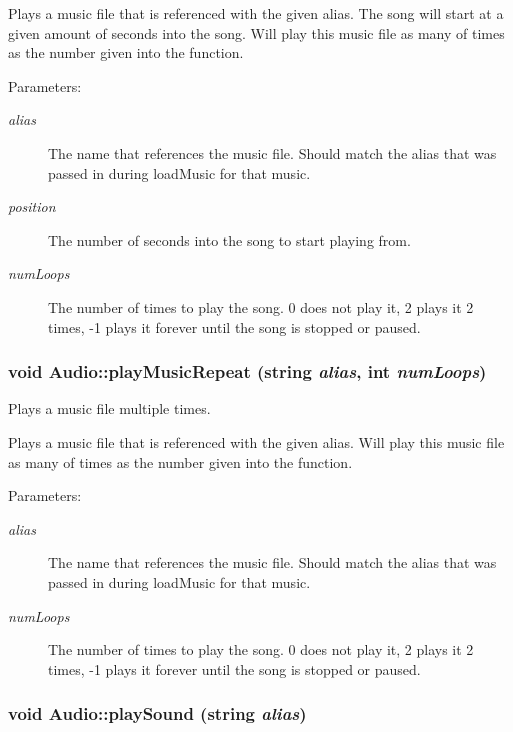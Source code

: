 Plays a music file that is referenced with the given alias. The song will start at a given amount of seconds into the song. Will play this music file as many of times as the number given into the function. \begin{Desc}
\item[Parameters:]
\begin{description}
\item[{\em alias}]The name that references the music file. Should match the alias that was passed in during loadMusic for that music. \item[{\em position}]The number of seconds into the song to start playing from. \item[{\em numLoops}]The number of times to play the song. 0 does not play it, 2 plays it 2 times, -1 plays it forever until the song is stopped or paused. \end{description}
\end{Desc}
\hypertarget{class_audio_a9ec7ff20da8b33428d39b0262743dac}{
\subsubsection[{playMusicRepeat}]{\setlength{\rightskip}{0pt plus 5cm}void Audio::playMusicRepeat (string {\em alias}, \/  int {\em numLoops})}}
\label{class_audio_a9ec7ff20da8b33428d39b0262743dac}


Plays a music file multiple times. 

Plays a music file that is referenced with the given alias. Will play this music file as many of times as the number given into the function. \begin{Desc}
\item[Parameters:]
\begin{description}
\item[{\em alias}]The name that references the music file. Should match the alias that was passed in during loadMusic for that music. \item[{\em numLoops}]The number of times to play the song. 0 does not play it, 2 plays it 2 times, -1 plays it forever until the song is stopped or paused. \end{description}
\end{Desc}
\hypertarget{class_audio_92dbc4a10cc3246c2b9e64de945e8bb4}{
\subsubsection[{playSound}]{\setlength{\rightskip}{0pt plus 5cm}void Audio::playSound (string {\em alias})}}
\label{class_audio_92dbc4a10cc3246c2b9e64de945e8bb4}


